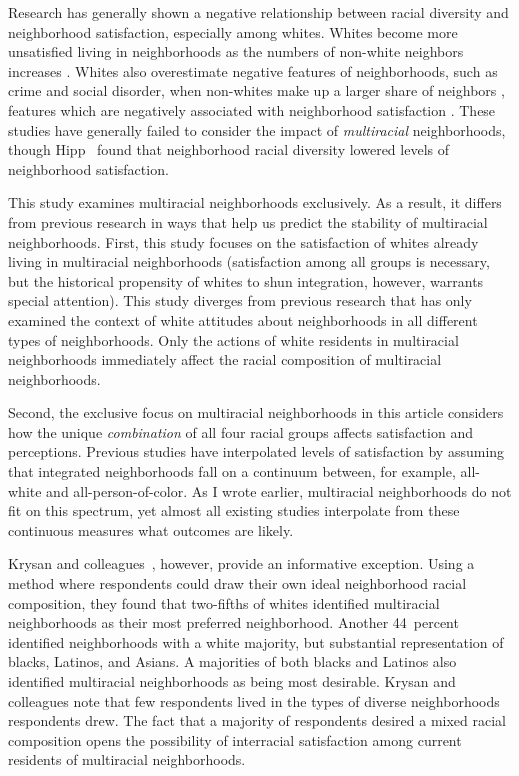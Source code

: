 \documentclass{baderart}
\begin{document}
Research has generally shown a negative relationship between racial diversity and neighborhood satisfaction, especially among whites. Whites become more unsatisfied living in neighborhoods as the numbers of non-white neighbors increases \citep{lee_neighborhood_1994, crowder_racial_2000, swaroop_determinants_2011, greif_intersection_2015}. Whites also overestimate negative features of neighborhoods, such as crime and social disorder, when non-whites make up a larger share of neighbors \citep{quillian_black_2001, sampson_seeing_2004}, features which are negatively associated with neighborhood satisfaction \citep{woldoff_effects_2002, hipp_specifying_2009}. These studies have generally failed to consider the impact of \emph{multiracial} neighborhoods, though Hipp~\citeyearpar{hipp_specifying_2009} found that neighborhood racial diversity lowered levels of neighborhood satisfaction.  

This study examines multiracial neighborhoods exclusively. As a result, it differs from previous research in ways that help us predict the stability of multiracial neighborhoods. First, this study focuses on the satisfaction of whites already living in multiracial neighborhoods (satisfaction among all groups is necessary, but the historical propensity of whites to shun integration, however, warrants special attention). This study diverges from previous research that has only examined the context of white attitudes about neighborhoods in all different types of neighborhoods. Only the actions of white residents in multiracial neighborhoods immediately affect the racial composition of multiracial neighborhoods. 

Second, the exclusive focus on multiracial neighborhoods in this article considers how the unique \emph{combination} of all four racial groups affects satisfaction and perceptions. Previous studies have interpolated levels of satisfaction by assuming that integrated neighborhoods fall on a continuum between, for example, all-white and all-person-of-color. As I wrote earlier, multiracial neighborhoods do not fit on this spectrum, yet almost all existing studies interpolate from these continuous measures what outcomes are likely. 

Krysan and colleagues~\citeyearpar{krysan_diversity_2017}, however, provide an informative exception. Using a method where respondents could draw their own ideal neighborhood racial composition, they found that two-fifths of whites identified multiracial neighborhoods as their most preferred neighborhood.  Another 44~percent identified neighborhoods with a white majority, but substantial representation of blacks, Latinos, and Asians. A majorities of both blacks and Latinos also identified multiracial neighborhoods as being most desirable. Krysan and colleagues note that few respondents lived in the types of diverse neighborhoods respondents drew. The fact that a majority of respondents desired a mixed racial composition opens the possibility of interracial satisfaction among current residents of multiracial neighborhoods. 
\end{document}
